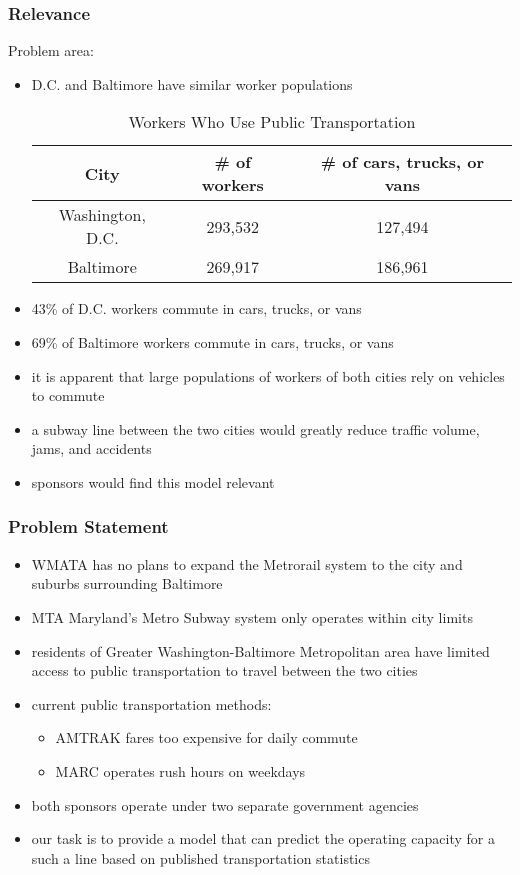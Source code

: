\documentclass[compress,handout,10pt]{beamer}
\let\olditem\item
\renewcommand{\item}{\setlength{\itemsep}{0.5\baselineskip}\olditem}
\begin{document}
\begin{frame}
    \frametitle{Relevance}
    Problem area:
    \vspace{7pt}
     \begin{itemize}
	\item D.C. and Baltimore have similar worker populations
\begin{table}[ht]
\caption{Workers Who Use Public Transportation}   %
\centering %
\begin{tabular}{c c c} %
\hline\hline %
City & \# of workers & \# of cars, trucks, or vans \\ [0.5ex]
\hline  %
Washington, D.C. & 293,532 & 127,494 \\%
Baltimore & 269,917 & 186,961 \\ [1ex] %
\hline %
\end{tabular}
\label{table:workers} %
\end{table}
	\item 43\% of D.C. workers commute in cars, trucks, or vans
	\item 69\% of Baltimore workers commute in cars, trucks, or vans
	\item it is apparent that large populations of workers of both cities rely on vehicles to commute
	\item a subway line between the two cities would greatly reduce traffic volume, jams, and accidents
	\item sponsors would find this model relevant
     \end{itemize}
\end{frame}

\begin{frame}
    \frametitle{Problem Statement}
    \begin{itemize}
        \item WMATA has no plans to expand the Metrorail system to the city and suburbs surrounding Baltimore
	\item MTA Maryland's Metro Subway system only operates within city limits
	\item residents of Greater Washington-Baltimore Metropolitan area have limited access to public transportation to travel between the two cities
	\item current public transportation methods:
	\begin{itemize}
		\item AMTRAK fares too expensive for daily commute
		\item MARC operates rush hours on weekdays
	\end{itemize}
	\item both sponsors operate under two separate government agencies
	\item our task is to provide a model that can predict the operating capacity for a such a line based on published transportation statistics
    \end{itemize}
\end{frame}
\end{document}
